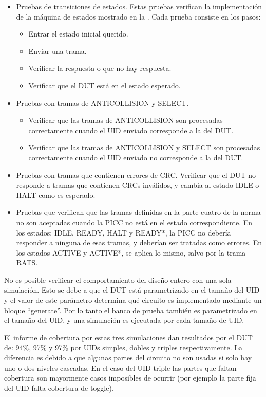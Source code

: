\documentclass[a4paper, twoside, 11pt]{report}
\begin{document}
\begin{itemize}
  \item Pruebas de transiciones de estados. Estas pruebas verifican la implementación de la máquina de estados mostrado en la . Cada prueba consiste en los pasos:
  \begin{itemize}
    \item Entrar el estado inicial querido.
    \item Enviar una trama.
    \item Verificar la respuesta o que no hay respuesta.
    \item Verificar que el DUT está en el estado esperado.
  \end{itemize}
  \item Pruebas con tramas de ANTICOLLISION y SELECT.
  \begin{itemize}
    \item Verificar que las tramas de ANTICOLLISION son procesadas correctamente cuando el UID enviado corresponde a la del DUT.
    \item Verificar que las tramas de ANTICOLLISION y SELECT son procesadas correctamente cuando el UID enviado no corresponde a la del DUT.
  \end{itemize}
  \item Pruebas con tramas que contienen errores de CRC. Verificar que el DUT no responde a tramas que contienen CRCs inválidos, y cambia al estado IDLE o HALT como es esperado.
  \item Pruebas que verifican que las tramas definidas en la parte cuatro de la norma no son aceptadas cuando la PICC no está en el estado correspondiente. En los estados: IDLE, READY, HALT y READY*, la PICC no debería responder a ninguna de esas tramas, y deberían ser tratadas como errores. En los estados ACTIVE y ACTIVE*, se aplica lo mismo, salvo por la trama RATS.
\end{itemize}

No es posible verificar el comportamiento del diseño entero con una sola simulación. Esto se debe a que el DUT está parametrizado en el tamaño del UID y el valor de este parámetro determina qué circuito es implementado mediante un bloque “generate”. Por lo tanto el banco de prueba también es parametrizado en el tamaño del UID, y una simulación es ejecutada por cada tamaño de UID.

El informe de cobertura por estas tres simulaciones dan resultados por el DUT de: 94\%, 97\% y 97\% por UIDs simples, dobles y triples respectivamente. La diferencia es debido a que algunas partes del circuito no son usadas si solo hay uno o dos niveles cascadas. En el caso del UID triple las partes que faltan cobertura son mayormente casos imposibles de ocurrir (por ejemplo la parte fija del UID falta cobertura de toggle).
\end{document}

